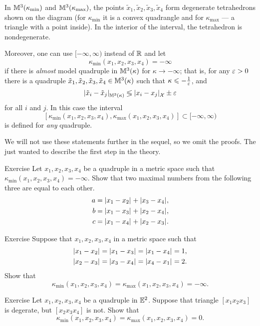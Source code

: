 In $\mathbb{M}^3(\kappa_{\min})$ and $\mathbb{M}^3(\kappa_{\max})$, the points $\tilde x_1,\tilde x_2,\tilde x_3,\tilde x_4$ form degenerate tetrahedrons shown on the diagram (for $\kappa_{\min}$ it is a convex quadrangle and for $\kappa_{\max}$ --- a triangle with a point inside).
In the interior of the interval, the tetrahedron is nondegenerate.

Moreover, one can use $[-\infty,\infty)$ instead of $\mathbb{R}$ 
and let
\[\kappa_{\min}(x_1,x_2,x_3,x_4)=-\infty\]
if there is \textit{almost} model quadruple in
$\mathbb{M}^3(\kappa)$ for $\kappa\to -\infty$;
that is, for any $\varepsilon>0$ there is a quadruple
$\tilde x_1,\tilde x_2,\tilde x_3,\tilde x_4\in\mathbb{M}^3(\kappa)$
such that $\kappa\leqslant -\tfrac1{\varepsilon}$, and
\[\dist{\tilde x_i}{\tilde x_j}{\MM^3(\kappa)}\lege\dist{x_i}{x_j}{\spc{X}}\pm\eps\]
for all $i$ and $j$.
In this case the interval 
\[[\kappa_{\min}(x_1,x_2,x_3,x_4),\kappa_{\max}(x_1,x_2,x_3,x_4)]\subset [-\infty,\infty)\]
is defined for \textit{any} quadruple.

We will not use these statements further in the sequel, so we omit the proofs.
The just wanted to describe the first step in the theory.

\begin{thm}{Exercise}
Let $x_1,x_2,x_3,x_4$ be a quadruple in a metric space such that $\kappa_{\min}(x_1,x_2,x_3,x_4)=-\infty$.
Show that two maximal numbers from the following three are equal to each other.
\begin{align*}
a&=\dist{x_1}{x_2}{}+\dist{x_3}{x_4}{},
\\
b&=\dist{x_1}{x_3}{}+\dist{x_2}{x_4}{},
\\
c&=\dist{x_1}{x_4}{}+\dist{x_2}{x_3}{}.
\end{align*}


\end{thm}


\begin{thm}{Exercise}
Suppose that $x_1,x_2,x_3,x_4$ in a metric space
such that
\begin{align*}
\dist{x_1}{x_2}{}=\dist{x_1}{x_3}{}=\dist{x_1}{x_4}{}&=1,
\\
\dist{x_2}{x_3}{}=\dist{x_3}{x_4}{}=\dist{x_4}{x_1}{}&=2.
\end{align*}
Show that 
\[\kappa_{\min}(x_1,x_2,x_3,x_4)=\kappa_{\max}(x_1,x_2,x_3,x_4)=-\infty.\]
\end{thm}

\begin{thm}{Exercise}
Let $x_1,x_2,x_3,x_4$ be a quadruple in $\mathbb{E}^2$.
Suppose that triangle $[x_1x_2x_3]$ is degerate, but  $[x_2x_3x_4]$ is not.
Show that 
\[\kappa_{\min}(x_1,x_2,x_3,x_4)=\kappa_{\max}(x_1,x_2,x_3,x_4)=0.\]
\end{thm}

